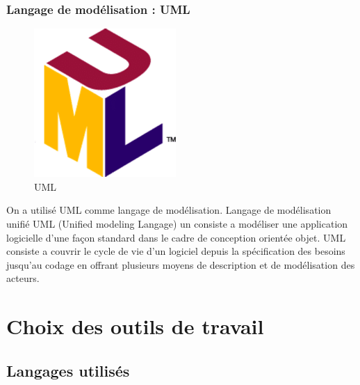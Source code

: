 \subsubsection{Langage de modélisation : UML}
\begin{figure}[h]
	\includegraphics[scale=1]{./Template LaTeX/Images/formation-uml-analser-concevoir.png}
	\centering
	\caption{UML}
\end{figure}
On a utilisé UML comme langage de modélisation.
Langage de modélisation unifié UML (Unified modeling Langage) un
consiste a modéliser une application logicielle d'une façon standard
dans le cadre de conception orientée objet.
UML consiste a couvrir le cycle de vie d'un logiciel depuis la
spécification des besoins jusqu'au codage en offrant plusieurs
moyens de description et de modélisation des acteurs.





\section{Choix des outils de travail }
\subsection{Langages utilisés}
